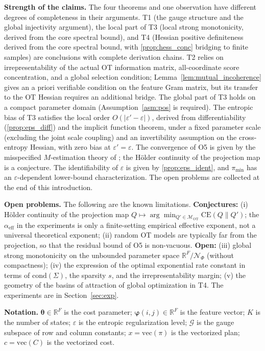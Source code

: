 \documentclass[11pt,a4paper]{article}
\theoremstyle{remark}
\begin{document}
\textbf{Strength of the claims.} The four theorems and one observation have different
degrees of completeness in their arguments. T1 (the gauge structure and the global
injectivity argument), the local part of T3 (local strong monotonicity, derived from the
core spectral bound), and T4 (Hessian positive definiteness derived from the core spectral
bound, with \ref{prop:hess_conc} bridging to finite samples) are conclusions with complete
derivation chains. T2 relies on irrepresentability of the actual OT information matrix,
all-coordinate score concentration, and a global selection condition;
Lemma~\ref{lem:mutual_incoherence} gives an a priori verifiable condition on the feature
Gram matrix, but its transfer to the OT Hessian requires an additional bridge. The global
part of T3 holds on a compact parameter domain (Assumption~\ref{asm:pos} is required). The
entropic bias of T3 satisfies the local order $O(|\varepsilon'-\varepsilon|)$, derived from
differentiability (\ref{prop:eps_diff}) and the implicit function theorem, under a fixed
parameter scale (excluding the joint scale coupling) and an invertibility assumption on the
cross-entropy Hessian, with zero bias at $\varepsilon'=\varepsilon$. The convergence of O5
is given by the misspecified $M$-estimation theory of \cite{white1982estimator}; the
H\"older continuity of the projection map is a conjecture. The identifiability of
$\varepsilon$ is given by \ref{prop:eps_ident}, and $\pi_{\min}$ has an
$\varepsilon$-dependent lower-bound characterization. The open problems are collected at
the end of this introduction.

\textbf{Open problems.} The following are the known limitations.
\textbf{Conjectures:} (i) H\"older continuity of the projection map
$Q\mapsto\arg\min_{Q'\in\mathcal{M}_{\mathrm{OT}}}\mathrm{CE}(Q\|Q')$; the
$\alpha_{\mathrm{eff}}$ in the experiments is only a finite-setting empirical effective
exponent, not a universal theoretical exponent; (ii) random OT models are typically far
from the projection, so that the residual bound of O5 is non-vacuous. \textbf{Open:}
(iii) global strong monotonicity on the unbounded parameter space
$\mathbb{R}^F/\mathcal{N}_\Phi$ (without compactness); (iv) the expression of the optimal
exponential rate constant in terms of $\mathrm{cond}(\Sigma)$, the sparsity $s$, and the
irrepresentability margin; (v) the geometry of the basins of attraction of global
optimization in T4. The experiments are in Section~\ref{sec:exp}.

\textbf{Notation.} $\bm{\theta}\in\mathbb{R}^F$ is the cost parameter;
$\bm{\varphi}(i,j)\in\mathbb{R}^F$ is the feature vector; $K$ is the number of states;
$\varepsilon$ is the entropic regularization level; $\mathcal{G}$ is the gauge subspace of
row and column constants; $x=\mathrm{vec}(\pi)$ is the vectorized plan;
$c=\mathrm{vec}(C)$ is the vectorized cost.
\end{document}
